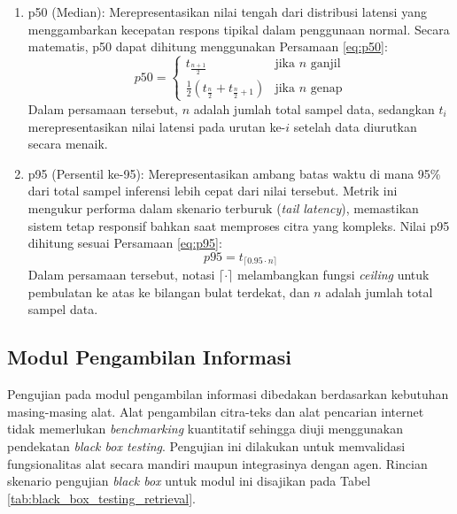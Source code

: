 \begin{enumerate}[nosep]
    \item p50 (Median): Merepresentasikan nilai tengah dari distribusi latensi yang menggambarkan kecepatan respons tipikal dalam penggunaan normal. Secara matematis, p50 dapat dihitung menggunakan Persamaan \ref{eq:p50}:
    \begin{equation}
        p50 = \begin{cases} t_{\frac{n+1}{2}} & \text{jika } n \text{ ganjil} \\ \frac{1}{2} (t_{\frac{n}{2}} + t_{\frac{n}{2}+1}) & \text{jika } n \text{ genap} \end{cases}
        \label{eq:p50}
    \end{equation}
    Dalam persamaan tersebut, $n$ adalah jumlah total sampel data, sedangkan $t_i$ merepresentasikan nilai latensi pada urutan ke-$i$ setelah data diurutkan secara menaik.

    \item p95 (Persentil ke-95): Merepresentasikan ambang batas waktu di mana 95\% dari total sampel inferensi lebih cepat dari nilai tersebut. Metrik ini mengukur performa dalam skenario terburuk (\textit{tail latency}), memastikan sistem tetap responsif bahkan saat memproses citra yang kompleks. Nilai p95 dihitung sesuai Persamaan \ref{eq:p95}:
    \begin{equation}
        p95 = t_{\lceil 0.95 \cdot n \rceil}
        \label{eq:p95}
    \end{equation}
    Dalam persamaan tersebut, notasi $\lceil \cdot \rceil$ melambangkan fungsi \textit{ceiling} untuk pembulatan ke atas ke bilangan bulat terdekat, dan $n$ adalah jumlah total sampel data.
\end{enumerate}

\subsection{Modul Pengambilan Informasi}
Pengujian pada modul pengambilan informasi dibedakan berdasarkan kebutuhan masing-masing alat. Alat pengambilan citra-teks dan alat pencarian internet tidak memerlukan \textit{benchmarking} kuantitatif sehingga diuji menggunakan pendekatan \textit{black box testing}. Pengujian ini dilakukan untuk memvalidasi fungsionalitas alat secara mandiri maupun integrasinya dengan agen. Rincian skenario pengujian \textit{black box} untuk modul ini disajikan pada Tabel \ref{tab:black_box_testing_retrieval}.

